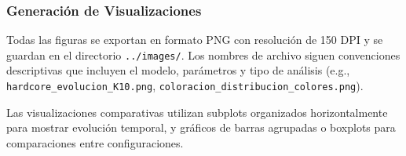 \subsubsection{Generación de Visualizaciones}

Todas las figuras se exportan en formato PNG con resolución de 150 DPI y se guardan en el directorio \texttt{../images/}. Los nombres de archivo siguen convenciones descriptivas que incluyen el modelo, parámetros y tipo de análisis (e.g., \texttt{hardcore\_evolucion\_K10.png}, \texttt{coloracion\_distribucion\_colores.png}).

Las visualizaciones comparativas utilizan subplots organizados horizontalmente para mostrar evolución temporal, y gráficos de barras agrupadas o boxplots para comparaciones entre configuraciones.
